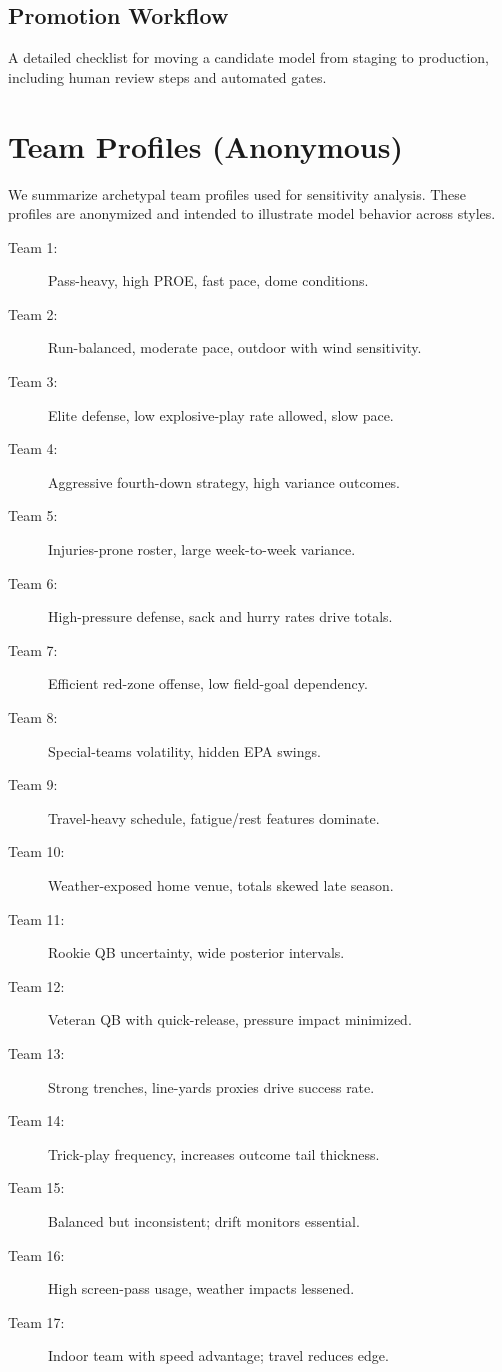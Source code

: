 \documentclass[12pt]{report}  %
\numberwithin{equation}{section}
\theoremstyle{plain}
\theoremstyle{definition}
\theoremstyle{remark}
\begin{document}
\section{Promotion Workflow}
A detailed checklist for moving a candidate model from staging to production, including human review steps and automated gates.

\chapter{Team Profiles (Anonymous)}
We summarize archetypal team profiles used for sensitivity analysis. These profiles are anonymized and intended to illustrate model behavior across styles.
\begin{description}
  \item[Team 1:] Pass-heavy, high PROE, fast pace, dome conditions.
  \item[Team 2:] Run-balanced, moderate pace, outdoor with wind sensitivity.
  \item[Team 3:] Elite defense, low explosive-play rate allowed, slow pace.
  \item[Team 4:] Aggressive fourth-down strategy, high variance outcomes.
  \item[Team 5:] Injuries-prone roster, large week-to-week variance.
  \item[Team 6:] High-pressure defense, sack and hurry rates drive totals.
  \item[Team 7:] Efficient red-zone offense, low field-goal dependency.
  \item[Team 8:] Special-teams volatility, hidden EPA swings.
  \item[Team 9:] Travel-heavy schedule, fatigue/rest features dominate.
  \item[Team 10:] Weather-exposed home venue, totals skewed late season.
  \item[Team 11:] Rookie QB uncertainty, wide posterior intervals.
  \item[Team 12:] Veteran QB with quick-release, pressure impact minimized.
  \item[Team 13:] Strong trenches, line-yards proxies drive success rate.
  \item[Team 14:] Trick-play frequency, increases outcome tail thickness.
  \item[Team 15:] Balanced but inconsistent; drift monitors essential.
  \item[Team 16:] High screen-pass usage, weather impacts lessened.
  \item[Team 17:] Indoor team with speed advantage; travel reduces edge.

\end{description}
\end{document}
